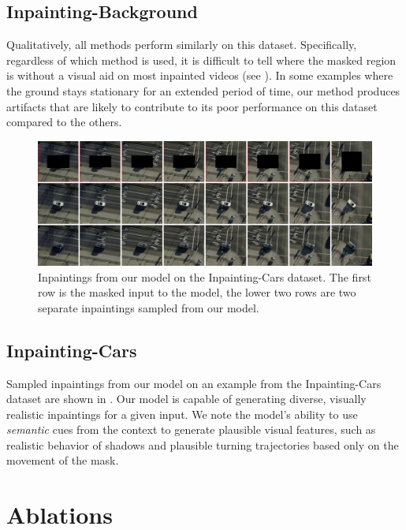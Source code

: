 \subsection{Inpainting-Background}
Qualitatively, all methods perform similarly on this dataset. Specifically, regardless of which method is used, it is difficult to tell where the masked region is without a visual aid on most inpainted videos (see ). In some examples where the ground stays stationary for an extended period of time, our method produces artifacts that are likely to contribute to its poor performance on this dataset
compared to the others. 
\begin{figure}[t]
\begin{center}
    \centering
    \captionsetup{type=figure}
    \includegraphics[width=\linewidth]{figures/updated-cars.pdf}
    \caption[Inpaintings from our model on the Inpainting-Cars dataset.]{Inpaintings from our model on the Inpainting-Cars dataset. The first row is the masked input to the model, the lower two rows are two separate inpaintings sampled from our model.}
    \label{fig:cars}
\end{center}%
\end{figure}
\subsection{Inpainting-Cars}
Sampled inpaintings from our model on an example from the Inpainting-Cars dataset are shown in . Our model is capable of generating diverse, visually realistic inpaintings for a given input. We note the model's ability to use \emph{semantic} cues from the context to generate plausible visual features, such as realistic behavior of shadows and plausible turning trajectories based only on the movement of the mask.

\section{Ablations}

